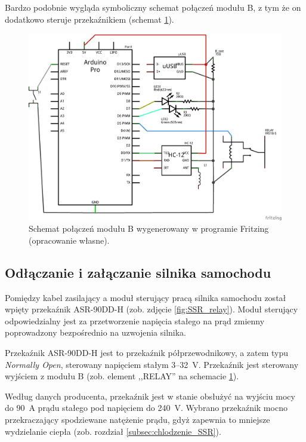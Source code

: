 Bardzo podobnie wygląda symboliczny schemat połączeń modułu B, z tym że on dodatkowo steruje przekaźnikiem (schemat \ref{fig:symbolic_schema_B}).

\begin{figure}[H]
	\centering
	\includegraphics[scale=0.4]{schemas/schema_moduleB_schem.png}
	\caption{\label{fig:symbolic_schema_B}Schemat połączeń modułu B wygenerowany w programie Fritzing \cite{Fritzing} (opracowanie własne).}
\end{figure}

\subsection{Odłączanie i załączanie silnika samochodu}
\label{subsec:odlaczanie_zalaczanie_silnika}

Pomiędzy kabel zasilający a moduł sterujący pracą silnika samochodu został wpięty przekaźnik ASR-90DD-H (zob. zdjęcie \ref{fig:SSR_relay}). Moduł sterujący odpowiedzialny jest za przetworzenie napięcia stałego na prąd zmienny poprowadzony bezpośrednio na uzwojenia silnika.

Przekaźnik ASR-90DD-H jest to przekaźnik półprzewodnikowy, a zatem typu \textit{Normally Open}, sterowany napięciem stałym \num{3}--\SI{32}{\volt}. Przekaźnik jest sterowany wyjściem z modułu B (zob. element ,,RELAY'' na schemacie \ref{fig:symbolic_schema_B}).

Według danych producenta, przekaźnik jest w stanie obsłużyć na wyjściu mocy do \SI{90}{\ampere} prądu stałego pod napięciem do \SI{240}{\volt}. Wybrano przekaźnik mocno przekraczający spodziewane natężenie prądu, gdyż zapewnia to mniejsze wydzielanie ciepła (zob. rozdział \ref{subsec:chlodzenie_SSR}).

